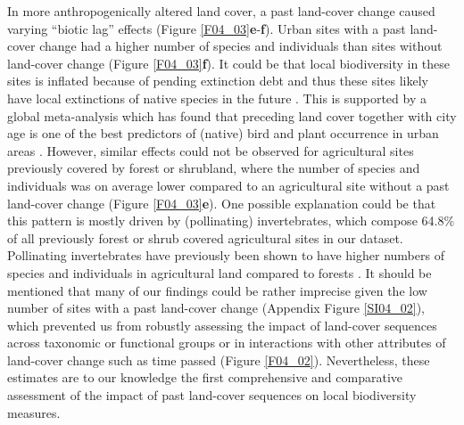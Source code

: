 In more anthropogenically altered land cover, a past land-cover change caused varying “biotic lag” effects (Figure \ref{F04_03}\textbf{e}-\textbf{f}). Urban sites with a past land-cover change had a higher number of species and individuals than sites without land-cover change (Figure \ref{F04_03}\textbf{f}). It could be that local biodiversity in these sites is inflated because of pending extinction debt and thus these sites likely have local extinctions of native species in the future \citep{Tilman1994,Kuussaari2009,Hylander2013}. This is supported by a global meta-analysis which has found that preceding land cover together with city age is one of the best predictors of (native) bird and plant occurrence in urban areas \citep{Aronson2014}. However, similar effects could not be observed for agricultural sites previously covered by forest or shrubland, where the number of species and individuals was on average lower compared to an agricultural site without a past land-cover change (Figure \ref{F04_03}\textbf{e}). One possible explanation could be that this pattern is mostly driven by (pollinating) invertebrates, which compose 64.8\% of all previously forest or shrub covered agricultural sites in our dataset. Pollinating invertebrates have previously been shown to have higher numbers of species and individuals in agricultural land compared to forests \citep{Winfree2009}. It should be mentioned that many of our findings could be rather imprecise given the low number of sites with a past land-cover change (Appendix Figure \ref{SI04_02}), which prevented us from robustly assessing the impact of land-cover sequences across taxonomic or functional groups \citep{Jung2018} or in interactions with other attributes of land-cover change such as time passed (Figure \ref{F04_02}). Nevertheless, these estimates are to our knowledge the first comprehensive and comparative assessment of the impact of past land-cover sequences on local biodiversity measures.

